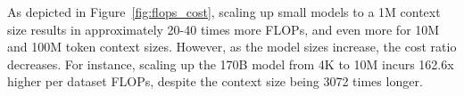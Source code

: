 \documentclass{article}
\begin{document}
As depicted in Figure~\ref{fig:flops_cost}, scaling up small models to a 1M context size results in approximately 20-40 times more FLOPs, and even more for 10M and 100M token context sizes. However, as the model sizes increase, the cost ratio decreases. For instance, scaling up the 170B model from 4K to 10M incurs 162.6x higher per dataset FLOPs, despite the context size being 3072 times longer.
\end{document}
